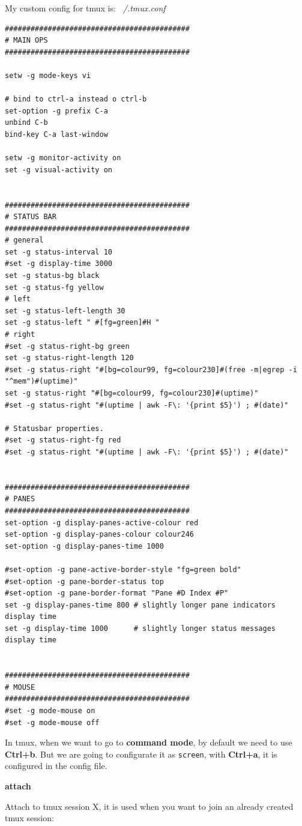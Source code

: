 \documentclass{article}
\newenvironment{codetemplate}[1][]{%
  \mybasecolorbox[#1]
  \itshape
}{%
  \endmybasecolorbox
}
\begin{document}
My custom config for tmux is:
\begin{codetemplate}{~/.tmux.conf}
\begin{verbatim}
###########################################
# MAIN OPS
###########################################

setw -g mode-keys vi

# bind to ctrl-a instead o ctrl-b
set-option -g prefix C-a
unbind C-b
bind-key C-a last-window

setw -g monitor-activity on
set -g visual-activity on


###########################################
# STATUS BAR
###########################################
# general
set -g status-interval 10
#set -g display-time 3000
set -g status-bg black
set -g status-fg yellow
# left
set -g status-left-length 30
set -g status-left " #[fg=green]#H "
# right
#set -g status-right-bg green
set -g status-right-length 120
#set -g status-right "#[bg=colour99, fg=colour230]#(free -m|egrep -i "^mem")#(uptime)"
set -g status-right "#[bg=colour99, fg=colour230]#(uptime)"
#set -g status-right "#(uptime | awk -F\: '{print $5}') ; #(date)"

# Statusbar properties.
#set -g status-right-fg red
#set -g status-right "#(uptime | awk -F\: '{print $5}') ; #(date)"


###########################################
# PANES
###########################################
set-option -g display-panes-active-colour red
set-option -g display-panes-colour colour246
set-option -g display-panes-time 1000

#set-option -g pane-active-border-style "fg=green bold"
#set-option -g pane-border-status top
#set-option -g pane-border-format "Pane #D Index #P"
set -g display-panes-time 800 # slightly longer pane indicators display time
set -g display-time 1000      # slightly longer status messages display time


###########################################
# MOUSE
###########################################
#set -g mode-mouse on
#set -g mode-mouse off
\end{verbatim}
\end{codetemplate}

In tmux, when we want to go to \textbf{command mode}, by default we need to use \textbf{Ctrl+b}. But we are going to configurate it as \verb|screen|, with \textbf{Ctrl+a}, it is configured in the config file.


\textbf{attach}

Attach to tmux session X, it is used when you want to join an already created tmux session:
\end{document}
